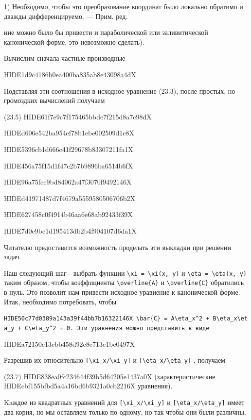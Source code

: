 \documentclass[
  ukrainian,
]{article}
\begin{document}
1) Необходимо, чтобы это преобразование координат было локально обратимо
и дважды дифференцируемо. --- Прим. ред.

ние можно было бы привести и параболической или заливитической
канонической форме, это невозможно сделать).

Вычислим сначала частные производные

HIDE1d9c4186b0ea400ba835ab8e43098a4dX

Подставляя эти соотношения в исходное уравнение (23.3), после простых,
но громоздких вычислений получаем

(23.5) HIDE61f7e9c7f175465bbde7f215d8a7c98dX

HIDEd606e542ba954ef78b1ebe002509d1e8X

HIDE5396cb1d666c41f29678b83307211fa1X

HIDE456a75f15d1f47c2b7b9896ba6514b6fX

HIDE96a75fcc9bd84062a47f3070f9492146X

HIDEd41971487d7f4679a5559580506706b2X

HIDE627458c0f4914b46aa6e68ab92433f39X

HIDE7d0e9be1d195413db2b4f904107d6da1X

Читателю предоставится возможность проделать эти выкладки при решении
задач.

Наш следующий шаг---выбрать функции
\texttt{\textbackslash{}xi\ =\ \textbackslash{}xi(x,\ y)} и
\texttt{\textbackslash{}eta\ =\ \textbackslash{}eta(x,\ y)} таким
образом, чтобы коэффициенты \texttt{\textbackslash{}overline\{A\}} и
\texttt{\textbackslash{}overline\{C\}} обратились в нуль. Это позволит
нам привести исходное уравиение к канонической форме. Итак, необходимо
потребовать, чтобы

\texttt{HIDE50c77d0389a143a39f44bb7b16322146X\ \textquotesingle{}\textbackslash{}bar\{C\}\ =\ A\textbackslash{}eta\_x\^{}2\ +\ B\textbackslash{}eta\_x\textbackslash{}eta\_y\ +\ C\textbackslash{}eta\_y\^{}2\ =\ 0.\textquotesingle{}\ Эти\ уравнения\ можно\ представить\ в\ виде}

HIDEa72150c13cbb458d92c8e713e1be0497X

Разрешив их относительно
\texttt{{[}\textbackslash{}xi\_x/\textbackslash{}xi\_y{]}} и
\texttt{{[}\textbackslash{}eta\_x/\textbackslash{}eta\_y{]}} , получаем

(23.7) HIDE838ea0fc234644f39b5d64205e1437a0X (характеристические
HIDEcbf155bfbd5a4a16bd6b9321a0cb2216X уравнения).

Kaждое из квадратных уравнений для
\texttt{{[}\textbackslash{}xi\_x/\textbackslash{}xi\_y{]}} и
\texttt{{[}\textbackslash{}eta\_x/\textbackslash{}eta\_y{]}} имеет два
кория, но мы оставляем только по одному, но так чтобы они были различны.
\end{document}

